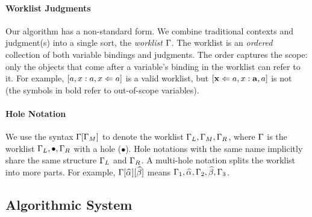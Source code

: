 \paragraph{Worklist Judgments} Our algorithm has a non-standard form.
We combine traditional contexts and judgment(s) into a single sort, the \emph{worklist} $\Gamma$.
The worklist is an \emph{ordered} collection of both variable bindings and judgments. The order captures the scope:
only the objects that come after a variable's binding in the worklist can refer to it.
For example, $[a,x:a,x \Leftarrow a]$ is a valid worklist, but $[{\bf x} \Leftarrow a, x:{\bf a},a]$ is not
(the symbols in bold refer to out-of-scope variables).

\paragraph{Hole Notation}
We use the syntax $\Gamma[\Gamma_M]$ to denote the worklist $\Gamma_L,\Gamma_M,\Gamma_R$,
where $\Gamma$ is the worklist $\Gamma_L,\bullet,\Gamma_R$ with a hole ($\bullet$).
Hole notations with the same name implicitly share the same structure $\Gamma_L$ and $\Gamma_R$.
A multi-hole notation splits the worklist into more parts.
For example, $\Gm[\al][\bt]$ means $\Gm_1,\al,\Gm_2,\bt,\Gm_3$.

\subsection{Algorithmic System}

\newcommand \algrule {\stepcounter{algRuleCounter}\rrule{\arabic{algRuleCounter}}}

